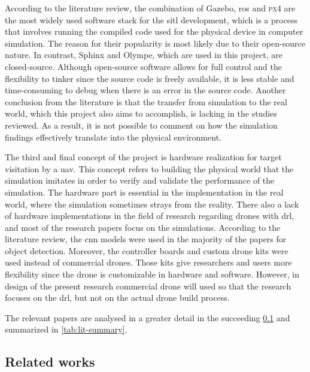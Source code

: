 \documentclass[../main.tex]{subfiles}
\begin{document}
According to the literature review, 
the combination of Gazebo, \gls{ros}
and \textsc{px4} are the most widely used software stack 
for the \gls{sitl} development,
which is a process that involves running the compiled code
used for the physical device in computer simulation.
The reason for their popularity is most likely 
due to their open-source nature. 
In contrast, Sphinx and Olympe, which are used in this project, 
are closed-source.
Although open-source software 
allows for full control and the flexibility to tinker
since the source code is freely available,
it is less stable and time-consuming to debug
when there is an error in the source code.
Another conclusion from the literature is that 
the transfer from simulation to the real world,
which this project also aims to accomplish,
is lacking in the studies reviewed.
As a result, it is not possible to comment on 
how the simulation findings effectively translate
into the physical environment.

The third and final concept of the project 
is hardware realization for target visitation by a \gls{uav}.
This concept refers to building the physical world
that the simulation imitates in order to 
verify and validate the performance of the simulation.
The hardware part is essential in the implementation 
in the real world, where the simulation 
sometimes strays from the reality.
There also a lack of hardware implementations in 
the field of research regarding drones with \gls{drl}, 
and most of the research papers focus on the simulations.
According to the literature review, the \gls{cnn} 
models were used in the majority of the papers for object detection. 
Moreover, the controller boards and custom drone kits 
were used instead of commercial drones.
Those kits give researchers and users more flexibility 
since the drone is customizable 
in hardware and software. However, in design of the present research commercial drone will used so that the research focuses on the \gls{drl}, but not on the actual drone build process. 
 

The relevant papers are analysed in a greater detail in
the succeeding \cref{sec:related-work} 
and summarized in \cref{tab:lit-summary}.



\subsection{Related works}\label{sec:related-work}
\end{document}
